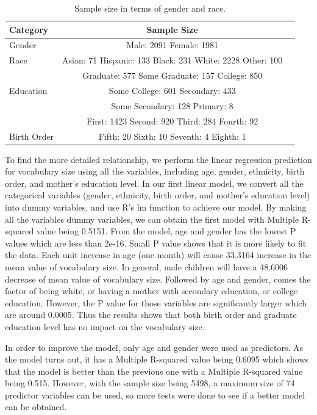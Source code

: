 \documentclass[12pt]{elsarticle}
\begin{document}
\begin{table}[ht]
\begin{tabular}{l*{1}{c}r}
Category & Sample Size \\
\hline
Gender& Male: 2091 Female: 1981 \\
\hline
Race & Asian: 71 Hispanic: 133 Black: 231 White: 2228 Other: 100  \\
\hline
& Graduate: 577 Some Graduate: 157 College: 850 \\
 Education & Some College: 601 Secondary: 433 \\
 & Some Secondary: 128 Primary: 8 \\
 \hline
 & First: 1423 Second: 920 Third: 284 Fourth: 92 \\
Birth Order & Fifth: 20 Sixth: 10 Seventh: 4 Eighth: 1 \\
\hline
\end{tabular}
\caption{Sample size in terms of gender and race.}
\label{tab1}
\end{table}

To find the more detailed relationship, we perform the linear regression prediction for vocabulary size using all the variables, including age, gender, ethnicity, birth order, and mother's education level. In our first linear model, we convert all the categorical variables (gender, ethnicity, birth order, and mother's education level) into dummy variables, and use R's lm function to achieve our model. By making all the variables dummy variables, we can obtain the first model with Multiple R-squared value being 0.5151. From the model, age and gender has the lowest P values which are less than 2e-16. Small P value shows that it is more likely to fit the data. Each unit increase in age (one month) will cause 33.3164 increase in the mean value of vocabulary size. In general, male children will have a 48.6006 decrease of mean value of vocabulary size. Followed by age and gender, comes the factor of being white, or having a mother with secondary education, or college education. However, the P value for those variables are significantly larger which are around 0.0005. Thus the results shows that both birth order and graduate education level has no impact on the vocabulary size.

In order to improve the model, only age and gender were used as predictors. As the model turns out, it has a Multiple R-squared value being 0.6095 which shows that the model is better than the previous one with a Multiple R-squared value being 0.515. However, with the sample size being 5498, a maximum size of 74 predictor variables can be used, so more tests were done to see if a better model can be obtained.
\end{document}
